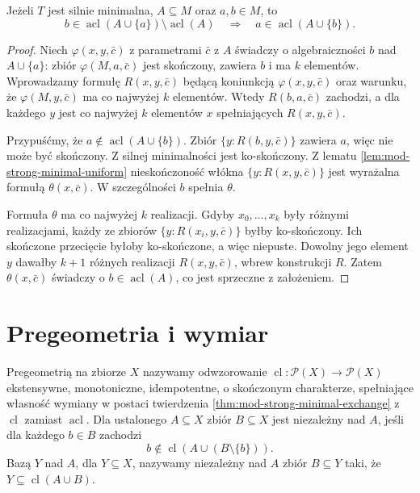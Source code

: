 \begin{twierdzenie}
\label{thm:mod-strong-minimal-exchange}
Jeżeli $T$ jest silnie minimalna,
$A\subseteq M$ oraz $a,b\in M$, to
\[
b\in\operatorname{acl}(A\cup\{a\})
\setminus\operatorname{acl}(A)
\quad\Longrightarrow\quad
a\in\operatorname{acl}(A\cup\{b\}).
\]
\end{twierdzenie}
\begin{proof}
Niech $\varphi(x,y,\bar c)$ z parametrami
$\bar c$ z $A$ świadczy o algebraiczności $b$
nad $A\cup\{a\}$: zbiór $\varphi(M,a,\bar c)$
jest skończony, zawiera $b$ i ma $k$ elementów.
Wprowadzamy formułę $R(x,y,\bar c)$ będącą
koniunkcją $\varphi(x,y,\bar c)$ oraz warunku,
że $\varphi(M,y,\bar c)$ ma co najwyżej $k$
elementów. Wtedy $R(b,a,\bar c)$ zachodzi,
a dla każdego $y$ jest co najwyżej $k$
elementów $x$ spełniających $R(x,y,\bar c)$.

Przypuśćmy, że $a\notin\operatorname{acl}(A\cup\{b\})$.
Zbiór $\{y:R(b,y,\bar c)\}$ zawiera $a$,
więc nie może być skończony.
Z silnej minimalności jest ko-skończony.
Z lematu \ref{lem:mod-strong-minimal-uniform}
nieskończoność włókna $\{y:R(x,y,\bar c)\}$
jest wyrażalna formułą $\theta(x,\bar c)$.
W szczególności $b$ spełnia $\theta$.

Formuła $\theta$ ma co najwyżej $k$ realizacji.
Gdyby $x_0,\ldots,x_k$ były różnymi realizacjami,
każdy ze zbiorów $\{y:R(x_i,y,\bar c)\}$
byłby ko-skończony. Ich skończone przecięcie
byłoby ko-skończone, a więc niepuste.
Dowolny jego element $y$ dawałby $k+1$
różnych realizacji $R(x,y,\bar c)$,
wbrew konstrukcji $R$.
Zatem $\theta(x,\bar c)$ świadczy
o $b\in\operatorname{acl}(A)$,
co jest sprzeczne z założeniem.
\end{proof}

\section{Pregeometria i wymiar}

\begin{definicja}
\label{def:mod-pregeometry}
Pregeometrią na zbiorze $X$ nazywamy odwzorowanie
$\operatorname{cl}:\mathcal P(X)\to\mathcal P(X)$
ekstensywne, monotoniczne, idempotentne,
o skończonym charakterze, spełniające
własność wymiany w postaci twierdzenia
\ref{thm:mod-strong-minimal-exchange}
z $\operatorname{cl}$ zamiast $\operatorname{acl}$.
Dla ustalonego $A\subseteq X$ zbiór $B\subseteq X$
jest niezależny nad $A$, jeśli dla każdego $b\in B$
zachodzi
\[
b\notin\operatorname{cl}(A\cup(B\setminus\{b\})).
\]
Bazą $Y$ nad $A$, dla $Y\subseteq X$,
nazywamy niezależny nad $A$ zbiór $B\subseteq Y$
taki, że $Y\subseteq\operatorname{cl}(A\cup B)$.
\end{definicja}

